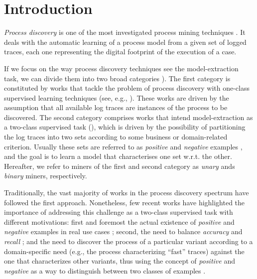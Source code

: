 

\section{Introduction}
\label{sec:introduction}

\emph{Process discovery} is one of the most investigated process mining techniques \cite{2012-Aalst}. It deals with the automatic learning of a process model from a given set of logged traces, each one representing the digital footprint of the execution of a case.

If we focus on the way process discovery techniques see the model-extraction task, we can divide them into two broad categories \cite{2018-Ponce}). The first category is constituted by works that tackle the problem of process discovery with one-class supervised learning techniques (see, e.g., \cite{2004-Aalst,2003-Weijters,2007-Gunther,2010-Aalst}). These works are driven by the assumption that all available log traces are instances of the process to be discovered. The second category comprises works that intend model-extraction as a two-class supervised task (\cite{2006-Maruster,2009-Goedertier,2009-Chesani}), which is driven by the possibility of partitioning the log traces into two sets according to some business or domain-related criterion. Usually these sets are referred to as \emph{positive} and \emph{negative} examples \cite{2018-Ponce}, and the goal is to learn a model that characterises one set w.r.t. the other. Hereafter, we refer to miners of the first and second category as \emph{unary} ands \emph{binary} miners, respectively. 

Traditionally, the vast majority of works in the process discovery spectrum have followed the first approach. Nonetheless, few recent works \cite{2018-Ponce,DBLP:conf/bpm/SlaatsDB21,deviant-arxiv}  have highlighted the importance of addressing this challenge as a two-class supervised task with different motivations: first and foremost the actual existence of \emph{positive} and \emph{negative} examples in real use cases \cite{2018-Ponce,DBLP:conf/bpm/SlaatsDB21}; second, the need to balance \emph{accuracy} and \emph{recall} \cite{DBLP:conf/bpm/SlaatsDB21}; and the need to discover the process of a particular variant according to a domain-specific need (e.g., the process characterizing ``fast'' traces) against the one that characterizes other variants, thus using the concept of \emph{positive} and \emph{negative} as a way to distinguish between two classes of examples \cite{deviant-arxiv}.  

